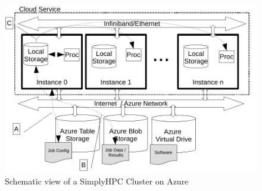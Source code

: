 \documentclass[a4paper,twoside]{article}
\begin{document}
%
%

\begin{figure}[!h]
	\vspace{-0.2cm}
	\centering
	\includegraphics[width=\linewidth]{azureDeployment.pdf}

	\caption{Schematic view of a SimplyHPC Cluster on Azure}	
	\label{fig:schemaService}
\end{figure}
\end{document}
